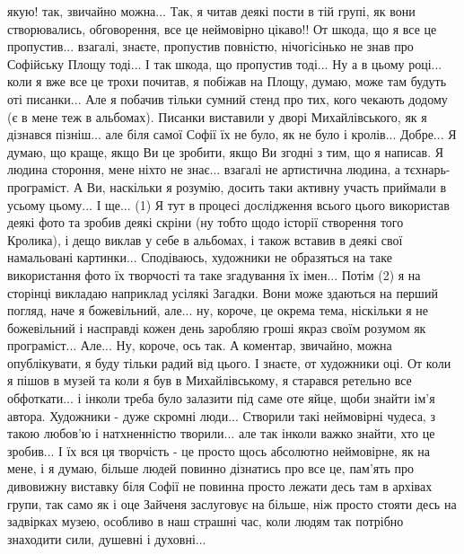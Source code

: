 якую! так, звичайно можна... Так, я читав деякі пости в тій групі, як вони
створювались, обговорення, все це неймовірно цікаво!! От шкода, що я все це
пропустив... взагалі, знаєте, пропустив повністю, нічогісінько не знав про
Софійську Площу тоді... І так шкода, що пропустив тоді... Ну а в цьому році...
коли я вже все це трохи почитав, я побіжав на Площу, думаю, може там будуть оті
писанки... Але я побачив тільки сумний стенд про тих, кого чекають додому (є в
мене теж в альбомах). Писанки виставили у дворі Михайлівського, як я дізнався
пізніш... але біля самої Софії їх не було, як не було і кролів... Добре... Я
думаю, що краще, якщо Ви це зробити, якщо Ви згодні з тим, що я написав. Я
людина стороння, мене ніхто не знає... взагалі не артистична людина, а
тєхнарь-програміст. А Ви, наскільки я розумію, досить таки активну участь
приймали в усьому цьому... І ще... (1) Я тут в процесі дослідження всього цього
використав деякі фото та зробив деякі скріни (ну тобто щодо історії створення
того Кролика), і дещо виклав у себе в альбомах, і також вставив в деякі свої
намальовані картинки... Сподіваюсь, художники не образяться на таке
використання фото їх творчості та таке згадування їх імен... Потім (2) я на
сторінці викладаю наприклад усілякі Загадки. Вони може здаються на перший
погляд, наче я божевільний, але... ну, короче, це окрема тема, ніскільки я не
божевільний і насправді кожен день заробляю гроші якраз своїм розумом як
програміст... Але... Ну, короче, ось так. А коментар, звичайно, можна
опублікувати, я буду тільки радий від цього. І знаєте, от художники оці. От
коли я пішов в музей та коли я був в Михайлівському, я старався ретельно все
обфоткати... і інколи треба було залазити під саме оте яйце, щоби знайти ім'я
автора. Художники - дуже скромні люди... Створили такі неймовірні чудеса, з
такою любов'ю і натхненністю творили... але так інколи важко знайти, хто це
зробив... І їх вся ця творчість - це просто щось абсолютно неймовірне, як на
мене, і я думаю, більше людей повинно дізнатись про все це, пам'ять про
дивовижну виставку біля Софії не повинна просто лежати десь там в архівах
групи, так само як і оце Зайченя заслуговує на більше, ніж просто стояти десь
на задвірках музею, особливо в наш страшні час, коли людям так потрібно
знаходити сили, душевні і духовні...
